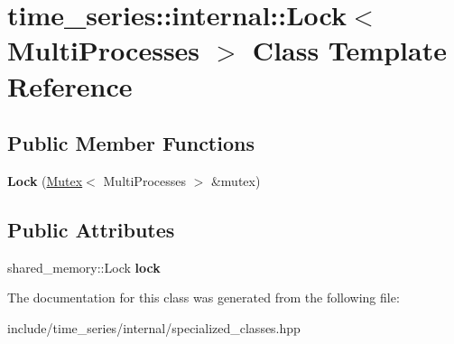 \hypertarget{classtime__series_1_1internal_1_1Lock_3_01MultiProcesses_01_4}{}\section{time\+\_\+series\+:\+:internal\+:\+:Lock$<$ Multi\+Processes $>$ Class Template Reference}
\label{classtime__series_1_1internal_1_1Lock_3_01MultiProcesses_01_4}
\subsection*{Public Member Functions}
\begin{DoxyCompactItemize}
\item 
{\bfseries Lock} (\hyperlink{classtime__series_1_1internal_1_1Mutex}{Mutex}$<$ Multi\+Processes $>$ \&mutex)\hypertarget{classtime__series_1_1internal_1_1Lock_3_01MultiProcesses_01_4_a920c36e5d5c29357484e030a271f6863}{}\label{classtime__series_1_1internal_1_1Lock_3_01MultiProcesses_01_4_a920c36e5d5c29357484e030a271f6863}

\end{DoxyCompactItemize}
\subsection*{Public Attributes}
\begin{DoxyCompactItemize}
\item 
shared\+\_\+memory\+::\+Lock {\bfseries lock}\hypertarget{classtime__series_1_1internal_1_1Lock_3_01MultiProcesses_01_4_a05955b0a5a1ef50e3e351337268ac943}{}\label{classtime__series_1_1internal_1_1Lock_3_01MultiProcesses_01_4_a05955b0a5a1ef50e3e351337268ac943}

\end{DoxyCompactItemize}


The documentation for this class was generated from the following file\+:\begin{DoxyCompactItemize}
\item 
include/time\+\_\+series/internal/specialized\+\_\+classes.\+hpp\end{DoxyCompactItemize}
